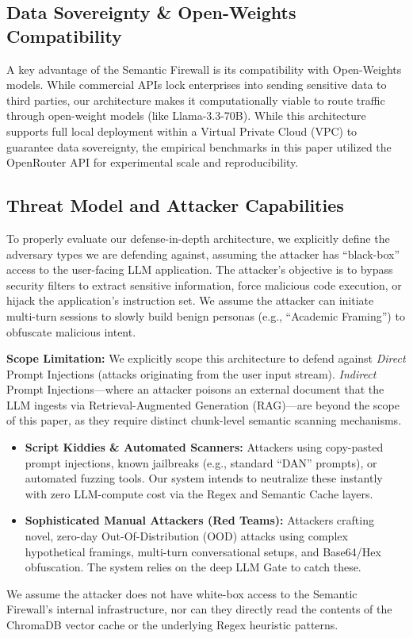 \documentclass[12pt,a4paper]{article}
\begin{document}
\subsection{Data Sovereignty \& Open-Weights Compatibility}

A key advantage of the Semantic Firewall is its compatibility with Open-Weights models. While commercial APIs lock enterprises into sending sensitive data to third parties, our architecture makes it computationally viable to route traffic through open-weight models (like Llama-3.3-70B). While this architecture supports full local deployment within a Virtual Private Cloud (VPC) to guarantee data sovereignty, the empirical benchmarks in this paper utilized the OpenRouter API for experimental scale and reproducibility.

\subsection{Threat Model and Attacker Capabilities}
To properly evaluate our defense-in-depth architecture, we explicitly define the adversary types we are defending against, assuming the attacker has ``black-box'' access to the user-facing LLM application. The attacker's objective is to bypass security filters to extract sensitive information, force malicious code execution, or hijack the application's instruction set. We assume the attacker can initiate multi-turn sessions to slowly build benign personas (e.g., ``Academic Framing'') to obfuscate malicious intent.

\textbf{Scope Limitation:} We explicitly scope this architecture to defend against \textit{Direct} Prompt Injections (attacks originating from the user input stream). \textit{Indirect} Prompt Injections---where an attacker poisons an external document that the LLM ingests via Retrieval-Augmented Generation (RAG)---are beyond the scope of this paper, as they require distinct chunk-level semantic scanning mechanisms.

\begin{itemize}
    \item \textbf{Script Kiddies \& Automated Scanners:} Attackers using copy-pasted prompt injections, known jailbreaks (e.g., standard ``DAN'' prompts), or automated fuzzing tools. Our system intends to neutralize these instantly with zero LLM-compute cost via the Regex and Semantic Cache layers.
    \item \textbf{Sophisticated Manual Attackers (Red Teams):} Attackers crafting novel, zero-day Out-Of-Distribution (OOD) attacks using complex hypothetical framings, multi-turn conversational setups, and Base64/Hex obfuscation. The system relies on the deep LLM Gate to catch these.
\end{itemize}
We assume the attacker does not have white-box access to the Semantic Firewall's internal infrastructure, nor can they directly read the contents of the ChromaDB vector cache or the underlying Regex heuristic patterns.
\end{document}
